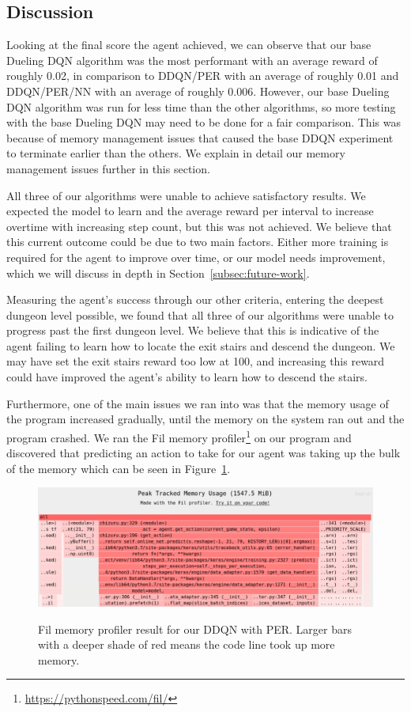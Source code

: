 \documentclass[12pt,a4paper]{article}
\begin{document}
    \subsection{Discussion}\label{subsec:discussion}
    Looking at the final score the agent achieved, we can observe that our base Dueling DQN algorithm was the most performant with an average reward of
    roughly 0.02, in comparison to DDQN/PER with an average of roughly 0.01 and DDQN/PER/NN with an average of roughly 0.006.
    However, our base Dueling DQN algorithm was run for less time than the other algorithms, so more testing with the
    base Dueling DQN may need to be done for a fair comparison.
    This was because of memory management issues that caused the base DDQN experiment to terminate earlier than the others.
    We explain in detail our memory management issues further in this section.

    All three of our algorithms were unable to achieve satisfactory results.
    We expected the model to learn and the average reward per interval to increase overtime with increasing step count, but this was not achieved.
    We believe that this current outcome could be due to two main factors.
    Either more training is required for the agent to improve over time, or our model needs improvement, which we will discuss in depth in Section~\ref{subsec:future-work}.

    Measuring the agent's success through our other criteria, entering the deepest dungeon level possible, we found that
    all three of our algorithms were unable to progress past the first dungeon level.
    We believe that this is indicative of the agent failing to learn how to locate the exit stairs and descend the dungeon.
    We may have set the exit stairs reward too low at 100, and increasing this reward could have improved the agent's ability to learn how
    to descend the stairs.

    Furthermore, one of the main issues we ran into was that
    the memory usage of the program increased gradually, until the memory on the system ran out and the program crashed.
    We ran the Fil memory profiler\footnote{\url{https://pythonspeed.com/fil/}} on our program and discovered that predicting an action to take for our agent was taking up the bulk of the memory which can be seen in Figure~\ref{fig:fil}.

    \begin{figure}[h]
        \caption[Fil Profiler result for DDQN with PER.]{Fil memory profiler result for our DDQN with PER. Larger bars with a deeper shade of red means the code line took up more memory.}
        \centering
        \includegraphics[scale=0.3]{fil}
        \label{fig:fil}
    \end{figure}
\end{document}
